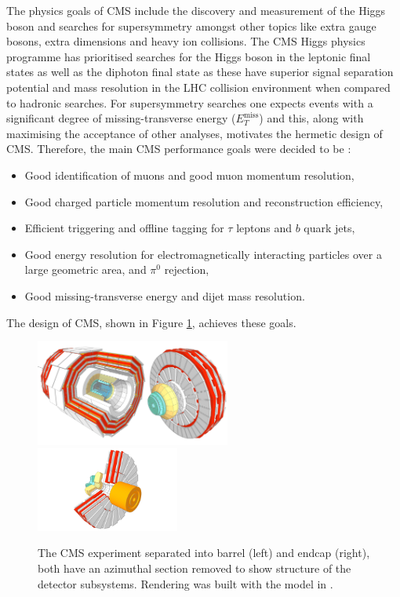 The physics goals of CMS include the discovery and measurement of the Higgs boson and searches for supersymmetry amongst other topics like extra gauge bosons, extra dimensions and heavy ion collisions. 
The CMS Higgs physics programme has prioritised searches for the Higgs boson in the leptonic final states as well as the diphoton final state as these have superior signal separation potential and mass resolution in the LHC collision environment when compared to hadronic searches. For supersymmetry searches one expects events with a significant degree of missing-transverse energy ($E_{T}^{\mathrm{miss}}$) and this, along with maximising the acceptance of other analyses, motivates the hermetic design of CMS. Therefore, the main CMS performance goals were decided to be \cite{CMSatLHC}:
\begin{itemize}%
    \item Good identification of muons and good muon momentum resolution,
    \item Good charged particle momentum resolution and reconstruction efficiency,
    \item Efficient triggering and offline tagging for $\tau$ leptons and $b$ quark jets, 
    \item Good energy resolution for electromagnetically interacting particles over a large geometric area, and $\pi^{0}$ rejection,
    \item Good missing-transverse energy and dijet mass resolution.
\end{itemize}
The design of CMS, shown in Figure \ref{fig:apparatus:CMS}, achieves these goals. 
\begin{figure}[h!]
    \begin{center}
        \includegraphics[width=0.57\textwidth]{figures/apparatus/CMS.pdf}
        \includegraphics[width=0.42\textwidth]{figures/apparatus/ENDCAP2.pdf}
    \end{center}    
    \caption{The CMS experiment separated into barrel (left) and endcap (right), both have an azimuthal section removed to show structure of the detector subsystems. Rendering was built with the model in \cite{SketchupCMS}.}
    \label{fig:apparatus:CMS}
\end{figure}



